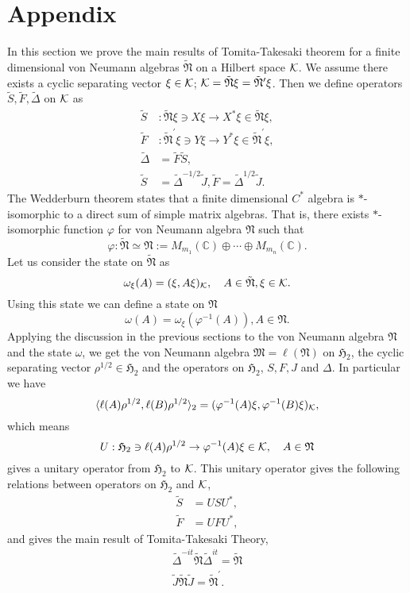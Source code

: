 \documentclass{article}
\begin{document}
\section{Appendix}
In this section we prove the main results of Tomita-Takesaki theorem for a finite dimensional
von Neumann algebras $\tilde{\mathfrak{N}}$ on a Hilbert space $\cal{K}$.
We assume there exists a cyclic separating vector $\xi\in {\cal K}$;
$\cal{K}=\tilde{\mathfrak{N}}\xi=\tilde{\mathfrak{N}}^\prime\xi$.
Then we define operators $\tilde{S},\tilde{F},\tilde{\Delta}$ on $\cal{K}$ as
\begin{equation}
\begin{split}
\tilde{S}&:\tilde{\mathfrak{N}}\xi\ni X\xi \to X^\ast \xi \in \tilde{\mathfrak{N}}\xi,\\
\tilde{F}&:\tilde{\mathfrak{N}}^\prime\xi\ni Y\xi \to Y^\ast \xi \in \tilde{\mathfrak{N}}^\prime\xi,\\
\tilde{\Delta}&=\tilde{F}\tilde{S},\\
\tilde{S}&=\tilde{\Delta}^{-1/2}\tilde{J}, \tilde{F}=\tilde{\Delta}^{1/2}\tilde{J}.
\end{split}
\end{equation}
The Wedderburn theorem states that a finite dimensional $C^{\ast}$ algebra is  $\ast$-isomorphic to a direct sum of simple matrix algebras. That is, there exists $\ast$-isomorphic function $\varphi$ for von Neumann algebra $\mathfrak{N}$ such that
$$
\varphi:\tilde{\mathfrak{N}}\simeq \mathfrak{N}:=M_{m_1}(\mathbb{C})\oplus \cdots \oplus M_{m_n}(\mathbb{C}).
$$
Let us consider the state on $\tilde{\mathfrak{N}}$ as
$$
\omega_\xi(A)=(\xi,A\xi)_{{\cal K}},\quad A\in \tilde{\mathfrak{N}},\xi\in {\cal K}.
$$
Using this state we can define a state on $\mathfrak{N}$
$$
\omega(A)=\omega_\xi(\varphi^{-1}(A)),A\in \mathfrak{N}.
$$
Applying the discussion in the previous sections to the von Neumann algebra $\mathfrak{N}$ and the state
$\omega$, we get
the von Neumann algebra $\mathfrak{M}=\ell (\mathfrak{N})$ on  
$\mathfrak{H}_2$, the cyclic separating vector $\rho^{1/2}\in \mathfrak{H}_2$
and the operators on $\mathfrak{H}_2$, $S, F, J$ and $\Delta$.
In particular we have
$$
\langle \ell(A)\rho^{1/2},\ell( B)\rho^{1/2}\rangle_2=(\varphi^{-1}(A)\xi,\varphi^{-1}(B)\xi)_{\cal K},
$$
which means
$$
U:\mathfrak{H}_2\ni\ell(A)\rho^{1/2}\to \varphi^{-1}(A)\xi\in {\cal K}, \quad A\in \mathfrak{N}
$$
gives a unitary operator from $\mathfrak{H}_2$ to ${\cal K}$.
This unitary operator gives the following relations between operators on $\mathfrak{H}_2$ and ${\cal K}$,
\begin{equation}
\begin{split}
\tilde{S}&=USU^{\ast},\\
\tilde{F}&=UFU^\ast ,
\end{split}
\end{equation}
and gives the main result of Tomita-Takesaki Theory,
\begin{equation}
\begin{split}
\tilde{\Delta}^{-it}\tilde{\mathfrak{N}}\tilde{\Delta}^{it}=\tilde{\mathfrak{N}}\\
\tilde{J}\tilde{\mathfrak{N}}\tilde{J}=\tilde{\mathfrak{N}}^\prime.
\end{split}
\end{equation}


\end{document}
